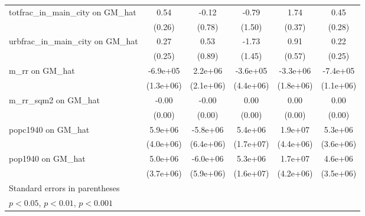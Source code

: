 \begin{table}[htbp]
\begin{tabular}{l*{5}{c}}
\addlinespace
totfrac\_in\_main\_city on GM\_hat&     0.54\sym{*}  &    -0.12         &    -0.79         &     1.74\sym{***}&     0.45         \\
                &   (0.26)         &   (0.78)         &   (1.50)         &   (0.37)         &   (0.28)         \\
\addlinespace
urbfrac\_in\_main\_city on GM\_hat&     0.27         &     0.53         &    -1.73         &     0.91         &     0.22         \\
                &   (0.25)         &   (0.89)         &   (1.45)         &   (0.57)         &   (0.25)         \\
\addlinespace
m\_rr on GM\_hat  & -6.9e+05         &  2.2e+06         & -3.6e+05         & -3.3e+06         & -7.4e+05         \\
                &(1.3e+06)         &(2.1e+06)         &(4.4e+06)         &(1.8e+06)         &(1.1e+06)         \\
\addlinespace
m\_rr\_sqm2 on GM\_hat&    -0.00         &    -0.00         &     0.00         &     0.00         &     0.00         \\
                &   (0.00)         &   (0.00)         &   (0.00)         &   (0.00)         &   (0.00)         \\
\addlinespace
popc1940 on GM\_hat&  5.9e+06         & -5.8e+06         &  5.4e+06         &  1.9e+07\sym{***}&  5.3e+06         \\
                &(4.0e+06)         &(6.4e+06)         &(1.7e+07)         &(4.4e+06)         &(3.6e+06)         \\
\addlinespace
pop1940 on GM\_hat&  5.0e+06         & -6.0e+06         &  5.3e+06         &  1.7e+07\sym{***}&  4.6e+06         \\
                &(3.7e+06)         &(5.9e+06)         &(1.6e+07)         &(4.2e+06)         &(3.5e+06)         \\
\bottomrule
\multicolumn{6}{l}{\footnotesize Standard errors in parentheses}\\
\multicolumn{6}{l}{\footnotesize \sym{*} \(p<0.05\), \sym{**} \(p<0.01\), \sym{***} \(p<0.001\)}\\
\end{tabular}
\end{table}
